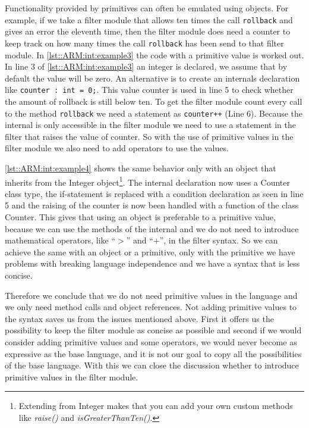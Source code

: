 Functionality provided by primitives can often be emulated using objects.
For example, if we take a filter module that allows ten times the call \lstinline!rollback! and gives an error the eleventh time, then the filter module does need a counter to keep track on how many times the call \lstinline!rollback! has been send to that filter module. 
In \autoref{lst::ARM:int:example3} the code with a primitive value is worked out.
In line 3 of \autoref{lst::ARM:int:example3} an integer is declared, we assume that by default the value will be zero. 
An alternative is to create an internals declaration like \lstinline!counter : int = 0;!. 
This value counter is used in line 5 to check whether the amount of rollback is still below ten. 
To get the filter module count every call to the method \lstinline!rollback! we need a statement as \lstinline!counter++! (Line 6). 
Because the internal is only accessible in the filter module we need to use a statement in the filter that raises the value of counter.
So with the use of primitive values in the filter module we also need to add operators to use the values.

\autoref{lst::ARM:int:example4} shows the same behavior only with an object that inherits from the Integer object\footnote{Extending from Integer makes that you can add your own custom methods like \emph{raise()} and \emph{isGreaterThanTen()}.}.
The internal declaration now uses a Counter class type, the if-statement is replaced with a condition declaration as seen in line 5 and the raising of the counter is now been handled with a function of the class Counter.
This gives that using an object is preferable to a primitive value, because we can use the methods of the internal and we do not need to introduce mathematical operators, like ``$>$'' and ``$+$'', in the filter syntax. 
So we can achieve the same with an object or a primitive, only with the primitive we have problems with breaking language independence and we have a syntax that is less concise.

Therefore we conclude that we do not need primitive values in the language and we only need method calls and object references.
Not adding primitive values to the syntax saves us from the issues mentioned above. 
First it offers us the possibility to keep the filter module as concise as possible and second if we would consider adding primitive values and some operators, we would never become as expressive as the base language, and it is not our goal to copy all the possibilities of the base language.
With this we can close the discussion whether to introduce primitive values in the filter module.

